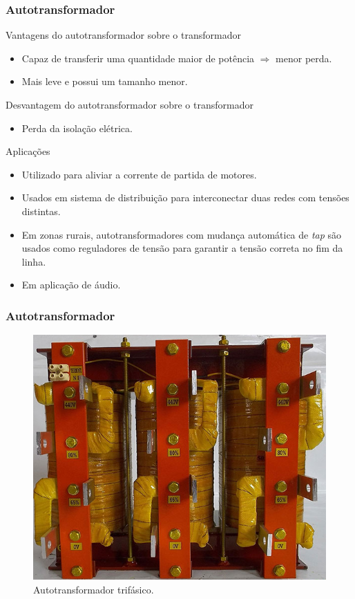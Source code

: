 \documentclass[mathserif,usenames,dvipsnames]{beamer}
\begin{document}
\begin{frame}
\frametitle{Autotransformador}
	\vspace{-0.2cm}
	\begin{block}{Vantagens do autotransformador sobre o transformador}
		\small
		\begin{itemize}
			\item Capaz de transferir uma quantidade maior de potência $\Rightarrow$ menor perda.
			\item Mais leve e possui um tamanho menor.
		\end{itemize}
	\end{block}
	\vspace{-0.1cm}
	\begin{block}{Desvantagem do autotransformador sobre o transformador}
		\small
		\begin{itemize}
			\item Perda da isolação elétrica.
		\end{itemize}
	\end{block}
	\vspace{-0.1cm}
	\begin{block}{Aplicações}
		\small
		\begin{itemize}
			\item Utilizado para aliviar a corrente de partida de motores.
			\item Usados em sistema de distribuição para interconectar duas redes com tensões distintas.
			\item Em zonas rurais, autotransformadores com mudança automática de \textit{tap} são usados como reguladores de tensão para garantir a tensão correta no fim da linha.
			\item Em aplicação de áudio.
		\end{itemize}		
	\end{block}
\end{frame}

\begin{frame}
\frametitle{Autotransformador}	
	\begin{figure}
		\centering
		\includegraphics[width=0.7\linewidth]{figuras/autotrafo}
		\caption{Autotransformador trifásico.}
		\label{fig:autotrafo}
	\end{figure}	
\end{frame}
\end{document}
